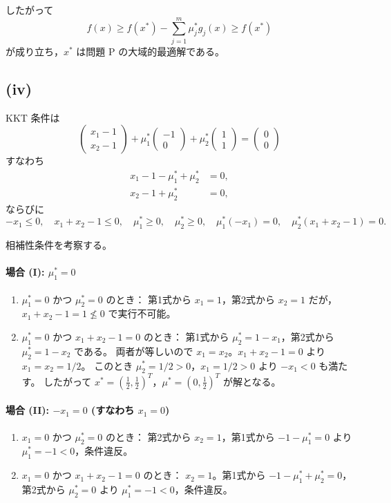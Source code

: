 \documentclass[12pt,a4paper]{article}
\begin{document}
したがって
\[f(x) \ge f(x^*) - \sum_{j=1}^m\mu_j^*g_j(x) \ge f(x^*)\]
が成り立ち，$x^*$ は問題 P の大域的最適解である。

\subsection*{(iv)}

KKT 条件は
\[
\begin{pmatrix} x_1-1 \\ x_2-1 \end{pmatrix} + \mu_1^* \begin{pmatrix} -1 \\ 0 \end{pmatrix} + \mu_2^* \begin{pmatrix} 1 \\ 1 \end{pmatrix} = \begin{pmatrix} 0 \\ 0 \end{pmatrix}
\]
すなわち
\begin{align*}
x_1-1 - \mu_1^* + \mu_2^* &= 0, \\
x_2-1 + \mu_2^* &= 0,
\end{align*}
ならびに
\[
-x_1 \le 0, \quad x_1+x_2-1 \le 0, \quad \mu_1^*\ge 0, \quad \mu_2^*\ge 0, \quad \mu_1^*(-x_1)=0, \quad \mu_2^*(x_1+x_2-1)=0.
\]

相補性条件を考察する。

\paragraph{場合 (I): $\mu_1^*=0$}
\begin{enumerate}
\item[(I-a)] $\mu_1^*=0$ かつ $\mu_2^*=0$ のとき：
  第1式から $x_1=1$，第2式から $x_2=1$ だが，$x_1+x_2-1=1\not\le 0$ で実行不可能。
  
\item[(I-b)] $\mu_1^*=0$ かつ $x_1+x_2-1=0$ のとき：
  第1式から $\mu_2^*=1-x_1$，第2式から $\mu_2^*=1-x_2$ である。
  両者が等しいので $x_1=x_2$。$x_1+x_2-1=0$ より $x_1=x_2=1/2$。
  このとき $\mu_2^*=1/2>0$，$x_1=1/2>0$ より $-x_1<0$ も満たす。
  したがって $x^*=(\tfrac{1}{2},\tfrac{1}{2})^T$，$\mu^*=(0,\tfrac{1}{2})^T$ が解となる。
\end{enumerate}

\paragraph{場合 (II): $-x_1=0$ (すなわち $x_1=0$)}
\begin{enumerate}
\item[(II-a)] $x_1=0$ かつ $\mu_2^*=0$ のとき：
  第2式から $x_2=1$，第1式から $-1-\mu_1^*=0$ より $\mu_1^*=-1<0$，条件違反。
  
\item[(II-b)] $x_1=0$ かつ $x_1+x_2-1=0$ のとき：
  $x_2=1$。第1式から $-1-\mu_1^*+\mu_2^*=0$，第2式から $\mu_2^*=0$ より
  $\mu_1^*=-1<0$，条件違反。
\end{enumerate}
\end{document}
